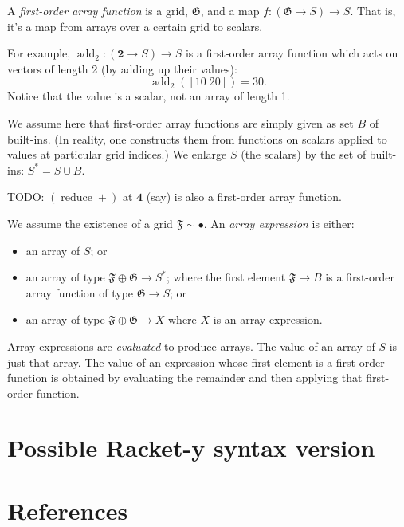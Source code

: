 \documentclass[11pt]{article}
\newcommand{\gr}[1]{\mathfrak{#1}}
\newcommand{\unit}{\bullet}
\DeclareMathOperator{\reduce}{reduce}
\begin{document}
A \emph{first-order array function} is a grid, \(\gr{G}\), and a map \(f: (\gr{G}\to
S)\to S\). That is, it's a map from arrays over a certain grid to scalars. 

For example, \(\operatorname{add}_2 : (\mathbf{2}\to S)\to S\) is a first-order
array function which acts on vectors of length 2 (by adding up their values):
$$
\operatorname{add}_2([10\; 20]) = 30.
$$ 
Notice that the value is a scalar, not an array of length 1.

We assume here that first-order array functions are simply given as set \(B\) of
built-ins.  (In reality, one constructs them from functions on scalars applied
to values at particular grid indices.) We enlarge \(S\) (the scalars) by the set
of built-ins: \(S^* = S\cup B\).

TODO: \((\reduce +)\) at \(\mathbf{4}\) (say) is also a first-order array function.  

We assume the existence of a grid \(\gr{F}\sim\unit\). An \emph{array expression} is
either:
\begin{itemize}
\item an array of \(S\); or
\item an array of type \(\gr{F}\oplus\gr{G}\to S^*\); where the first element
\(\gr{F}\to B\) is a first-order array function of type \(\gr{G}\to S\); or
\item an array of type \(\gr{F}\oplus\gr{G}\to X\) where \(X\) is an array expression.
\end{itemize}

Array expressions are \emph{evaluated} to produce arrays. The value of an array of
\(S\) is just that array. The value of an expression whose first element is a
first-order function is obtained by evaluating the remainder and then applying
that first-order function.

\section{Possible Racket-y syntax version}
\label{sec:orga1852e4}


\section{References}
\label{sec:orgbf56ab8}

\label{org334ac2d}


\label{orgefbceba}

\end{document}
